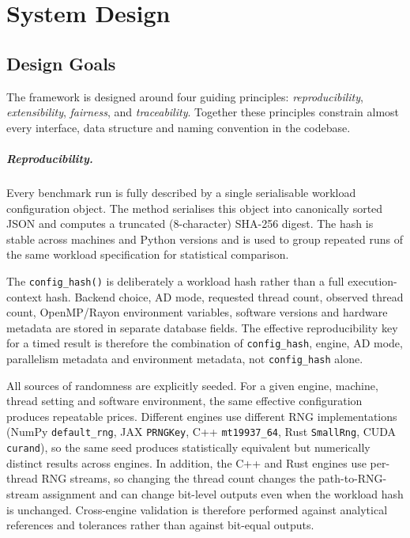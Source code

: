 \chapter{System Design}
\label{chap:system-design}

\section{Design Goals}
\label{sec:design-goals}

The framework is designed around four guiding principles: \emph{reproducibility},
\emph{extensibility}, \emph{fairness}, and \emph{traceability}. Together these principles
constrain almost every interface, data structure and naming convention in the codebase.

\paragraph{Reproducibility.}
Every benchmark run is fully described by a single serialisable workload
configuration object. The  method serialises this object into
canonically sorted JSON and computes a truncated (8-character) SHA-256 digest. The
hash is stable across machines and Python versions and is used to group repeated
runs of the same workload specification for statistical comparison.

The \texttt{config\_hash()} is deliberately a workload hash rather than a full
execution-context hash. Backend choice, AD mode, requested thread count,
observed thread count, OpenMP/Rayon environment variables, software versions and
hardware metadata are stored in separate database fields. The effective
reproducibility key for a timed result is therefore the combination of
\texttt{config\_hash}, engine, AD mode, parallelism metadata and environment
metadata, not \texttt{config\_hash} alone.

All sources of randomness are explicitly seeded. For a given engine, machine,
thread setting and software environment, the same effective configuration
produces repeatable prices. Different engines use different RNG implementations
(NumPy \texttt{default\_rng}, JAX \texttt{PRNGKey}, C++ \texttt{mt19937\_64},
Rust \texttt{SmallRng}, CUDA \texttt{curand}), so the same seed produces
statistically equivalent but numerically distinct results across engines. In
addition, the C++ and Rust engines use per-thread RNG streams, so changing the
thread count changes the path-to-RNG-stream assignment and can change bit-level
outputs even when the workload hash is unchanged. Cross-engine validation is
therefore performed against analytical references and tolerances rather than
against bit-equal outputs.

